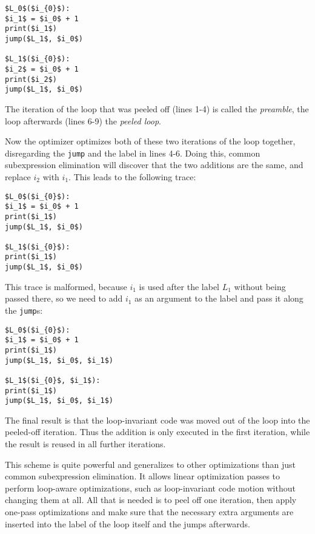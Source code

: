 \documentclass[preprint]{sigplanconf}
\begin{document}
\begin{lstlisting}[mathescape,numbers = right,basicstyle=\setstretch{1.05}\ttfamily\scriptsize]
$L_0$($i_{0}$):
$i_1$ = $i_0$ + 1
print($i_1$)
jump($L_1$, $i_0$)

$L_1$($i_{0}$):
$i_2$ = $i_0$ + 1
print($i_2$)
jump($L_1$, $i_0$)
\end{lstlisting}

The iteration of the loop that was peeled off (lines 1-4) is called the
\emph{preamble}, the loop afterwards (lines 6-9) the \emph{peeled loop}.

Now the optimizer optimizes both of these two iterations of the loop together,
disregarding the \lstinline{jump} and the label in lines 4-6. Doing this, common
subexpression elimination will discover that the two additions are the same, and
replace $i_2$ with $i_1$. This leads to the following trace:

\begin{lstlisting}[mathescape,numbers = right,basicstyle=\setstretch{1.05}\ttfamily\scriptsize]
$L_0$($i_{0}$):
$i_1$ = $i_0$ + 1
print($i_1$)
jump($L_1$, $i_0$)

$L_1$($i_{0}$):
print($i_1$)
jump($L_1$, $i_0$)
\end{lstlisting}

This trace is malformed, because $i_1$ is used after the label $L_1$ without
being passed there, so we need to add $i_1$ as an argument to the label and pass
it along the \lstinline{jump}s:

\begin{lstlisting}[mathescape,numbers = right,basicstyle=\setstretch{1.05}\ttfamily\scriptsize]
$L_0$($i_{0}$):
$i_1$ = $i_0$ + 1
print($i_1$)
jump($L_1$, $i_0$, $i_1$)

$L_1$($i_{0}$, $i_1$):
print($i_1$)
jump($L_1$, $i_0$, $i_1$)
\end{lstlisting}

The final result is that the loop-invariant code was moved out of the loop into
the peeled-off iteration. Thus the addition is only executed in the first
iteration, while the result is reused in all further iterations.

This scheme is quite powerful and generalizes to other optimizations than just
common subexpression elimination. It allows linear optimization passes to
perform loop-aware optimizations, such as loop-invariant code motion without
changing them at all. All that is needed is to peel off one iteration, then
apply one-pass optimizations and make sure that the necessary extra
arguments are inserted into the label of the loop itself and the jumps
afterwards.
\end{document}

